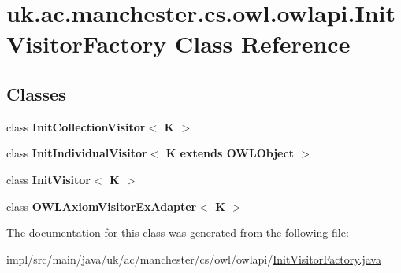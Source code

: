\hypertarget{classuk_1_1ac_1_1manchester_1_1cs_1_1owl_1_1owlapi_1_1_init_visitor_factory}{\section{uk.\-ac.\-manchester.\-cs.\-owl.\-owlapi.\-Init\-Visitor\-Factory Class Reference}
\label{classuk_1_1ac_1_1manchester_1_1cs_1_1owl_1_1owlapi_1_1_init_visitor_factory}
}
\subsection*{Classes}
\begin{DoxyCompactItemize}
\item 
class {\bfseries Init\-Collection\-Visitor$<$ K $>$}
\item 
class {\bfseries Init\-Individual\-Visitor$<$ K extends O\-W\-L\-Object $>$}
\item 
class {\bfseries Init\-Visitor$<$ K $>$}
\item 
class {\bfseries O\-W\-L\-Axiom\-Visitor\-Ex\-Adapter$<$ K $>$}
\end{DoxyCompactItemize}


The documentation for this class was generated from the following file\-:\begin{DoxyCompactItemize}
\item 
impl/src/main/java/uk/ac/manchester/cs/owl/owlapi/\hyperlink{_init_visitor_factory_8java}{Init\-Visitor\-Factory.\-java}\end{DoxyCompactItemize}
